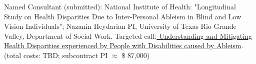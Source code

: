 

\item Named Consultant (submitted): National Institute of Health: %
"Longitudinal Study on Health Disparities Due to Inter-Personal Ableism in Blind and Low Vision Individuals"; Nazanin Heydarian PI, University of Texas Rio Grande Valley, Department of Social Work. Targeted call:\href{https://grants.nih.gov/grants/guide/rfa-files/RFA-HD-24-007.html}{\color{blue} Understanding and Mitigating Health Disparities experienced by People with Disabilities caused by Ableism}. (total costs: TBD; subcontract PI $\approx$ \$ 87,000)






%
%
